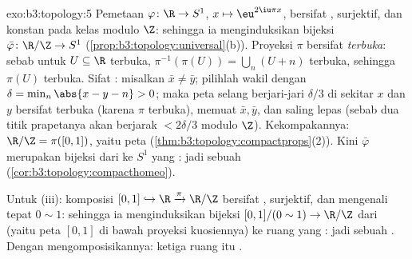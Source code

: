 \begin{solution}{exo:b3:topology:5}
Pemetaan $\varphi \colon \R \to S^1$, $x \mapsto \eu^{2\iu\pi x}$, bersifat
, surjektif, dan konstan pada kelas modulo $\Z$: sehingga ia
menginduksikan bijeksi  $\bar\varphi \colon \R/\Z \to
S^1$ (\cref{prop:b3:topology:universal}(b)). Proyeksi
$\pi$ bersifat \emph{terbuka}: sebab untuk $U \subseteq \R$ terbuka,
$\pi^{-1}(\pi(U)) = \bigcup_{n}(U + n)$ terbuka, sehingga $\pi(U)$
terbuka. Sifat : misalkan $\bar x \neq \bar y$; pilihlah
wakil dengan $\delta = \min_{n}\abs{x - y - n} > 0$;
maka peta selang berjari-jari $\delta/3$ di sekitar $x$ dan
$y$ bersifat terbuka (karena $\pi$ terbuka), memuat $\bar x, \bar y$, dan
saling lepas (sebab dua titik prapetanya akan berjarak $< 2\delta/3$
modulo $\Z$). Kekompakannya: $\R/\Z = \pi([0,1])$, yaitu peta 
 (\cref{thm:b3:topology:compactprops}(2)). Kini
$\bar\varphi$ merupakan bijeksi  dari  ke
$S^1$ yang : jadi sebuah 
(\cref{cor:b3:topology:compacthomeo}).

Untuk (iii): komposisi $[0,1] \hookrightarrow \R
\xrightarrow{\pi} \R/\Z$ bersifat , surjektif, dan
mengenali tepat $0 \sim 1$: sehingga ia menginduksikan bijeksi 
$[0,1]/(0\sim1) \to \R/\Z$ dari  (yaitu peta
 $[0,1]$ di bawah proyeksi kuosiennya) ke ruang yang
: jadi sebuah . Dengan mengomposisikannya: ketiga ruang itu
.
\end{solution}

